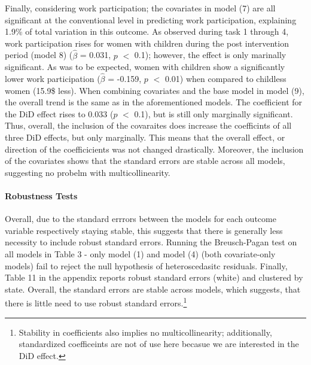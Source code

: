 \documentclass[a4paper]{article}
\begin{document}
\indent Finally, considering work participation; the covariates in model (7) are all significant at the conventional level in predicting work participation, explaining 1.9\% of total variation in this outcome. As observed during task 1 through 4, work participation rises for women with children during the post intervention period (model 8) ($\hat{\beta}$ = 0.031, $p$ $<$ 0.1); however, the effect is only marinally significant. As was to be expected, women with children show a significantly lower work participation ($\hat{\beta}$ = -0.159, $p$ $<$ 0.01) when compared to childless women (15.9\$ less). When combining covariates and the base model in model (9), the overall trend is the same as in the aforementioned models. The coefficient for the DiD effect rises to 0.033 ($p$ $<$ 0.1), but is still only marginally significant.
Thus, overall, the inclusion of the covaraites does increase the coefficints of all three DiD effects, but only marginally. This means that the overall effect, or direction of the coefficicients was not changed drastically. Moreover, the inclusion of the covariates shows that the standard errors are stable across all models, suggesting no probelm with multicollinearity. 
\paragraph{Robustness Tests} Overall, due to the standard errrors between the models for each outcome variable respectively staying stable, this suggests that there is generally less necessity to include robust standard errors. Running the Breusch-Pagan test on all models in Table 3 - only model (1) and model (4) (both covariate-only models) fail to reject the null hypothesis of heteroscedasitc residuals. Finally, Table 11 in the appendix reports robust standard errors (white) and clustered by state. Overall, the standard errors are stable across models, which suggests, that there is little need to use robust standard errors.\footnote{Stability in coefficients also implies no multicollinearity; additionally, standardized coefficeints are not of use here becasue we are interested in the DiD effect.} 
\end{document}

